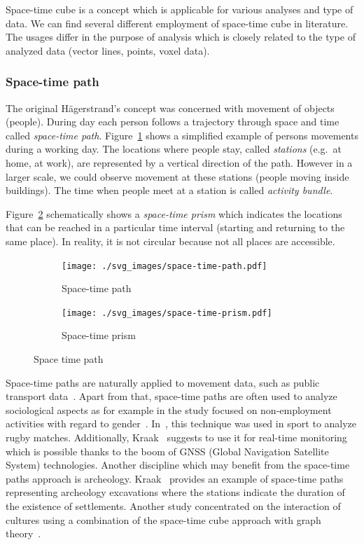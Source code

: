 \documentclass[a4paper,12pt,oneside]{book}
\begin{document}
Space-time cube is a concept which is applicable for various analyses and type of data.
We can find several different employment of space-time cube in literature.
The usages differ in the purpose of analysis which is closely related
to the type of analyzed data (vector lines, points, voxel data).

\subsubsection{Space-time path}
The original Hägerstrand's concept was concerned with movement of objects (people).
During day each person follows a trajectory through space and time called
\emph{space-time path}. Figure~\ref{fig:st-path} shows a simplified example
of persons movements during a working day. The locations where people stay,
called \emph{stations} (e.g.\ at home, at work), are represented by a vertical direction of the path.
However in a larger scale, we could observe movement at these stations
(people moving inside buildings). The time when people meet at a station is called \emph{activity bundle}.

Figure~\ref{fig:st-prism} schematically shows a \emph{space-time prism}
which indicates the locations that can be reached in a particular time interval
(starting and returning to the same place). In reality, it is not circular because
not all places are accessible.




\begin{figure}[ht]
\centering
    \begin{subfigure}[ht]{0.49\textwidth}
    \centering
        \texttt{[image: ./svg\_images/space-time-path.pdf]}
    \caption{Space-time path}
    \label{fig:st-path}
    \end{subfigure}
    \begin{subfigure}[ht]{0.49\textwidth}
    \centering
        \texttt{[image: ./svg\_images/space-time-prism.pdf]}
    \caption{Space-time prism}
    \label{fig:st-prism}
    \end{subfigure}
\caption{Space time path}
\label{fig:st-path-prism}
\end{figure}


Space-time paths are naturally applied to movement data, such as public transport data~\cite{transport2005visualisation}.
Apart from that, space-time paths are often used to analyze sociological aspects
as for example in the study focused on non-employment activities with regard to gender~\cite{kwan1999gender}.
In~\cite{moore2003time}, this technique was used in sport to analyze rugby matches.
Additionally, Kraak~\cite{kraak2005visualization} suggests to use it for real-time monitoring which is possible thanks to
the boom of GNSS (Global Navigation Satellite System) technologies.
Another discipline which may benefit from the space-time paths approach is archeology.
Kraak~\cite{kraak2005visualization} provides an example of space-time paths representing
archeology excavations where the stations indicate the duration of the existence of settlements.
Another study concentrated on the interaction of cultures using a combination of the space-time cube approach
with graph theory~\cite{huisman2008development}.
\end{document}
